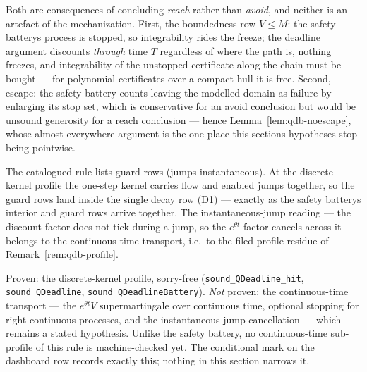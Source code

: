 \begin{bremark}
\label{rem:qdb-asym}
Both are consequences of concluding \emph{reach} rather than
\emph{avoid}, and neither is an artefact of the mechanization. First,
the boundedness row $V \le M$: the safety battery\textquotesingle s
process is stopped, so integrability rides the freeze; the deadline
argument discounts \emph{through} time $T$ regardless of where the path
is, nothing freezes, and integrability of the unstopped certificate
along the chain must be bought --- for polynomial certificates over a
compact hull it is free. Second, escape: the safety battery counts
leaving the modelled domain as failure by enlarging its stop set, which
is conservative for an avoid conclusion but would be unsound generosity
for a reach conclusion --- hence Lemma~\ref{lem:qdb-noescape}, whose
almost-everywhere argument is the one place this
section\textquotesingle s hypotheses stop being pointwise.
\end{bremark}

\begin{bremark}\label{rem:qdb-guards}
The catalogued rule lists guard rows (jumps instantaneous). At the
discrete-kernel profile the one-step kernel carries flow and enabled
jumps together, so the guard rows land inside the single decay row (D1)
--- exactly as the safety battery\textquotesingle s interior and guard
rows arrive together. The instantaneous-jump reading --- the discount
factor does not tick during a jump, so the $e^{\theta t}$ factor cancels
across it --- belongs to the continuous-time transport, i.e.\ to the
filed profile residue of Remark~\ref{rem:qdb-profile}.
\end{bremark}

\begin{bremark}
\label{rem:qdb-profile}
Proven: the discrete-kernel profile, sorry-free
(\texttt{sound\_QDeadline\_hit}, \texttt{sound\_QDeadline},
\texttt{sound\_QDeadlineBattery}). \emph{Not} proven: the
continuous-time transport --- the $e^{\theta t} V$ supermartingale over
continuous time, optional stopping for right-continuous processes, and
the instantaneous-jump cancellation --- which remains a stated
hypothesis. Unlike the safety battery, no continuous-time sub-profile of
this rule is machine-checked yet. The conditional mark on the dashboard
row records exactly this; nothing in this section narrows it.
\end{bremark}


